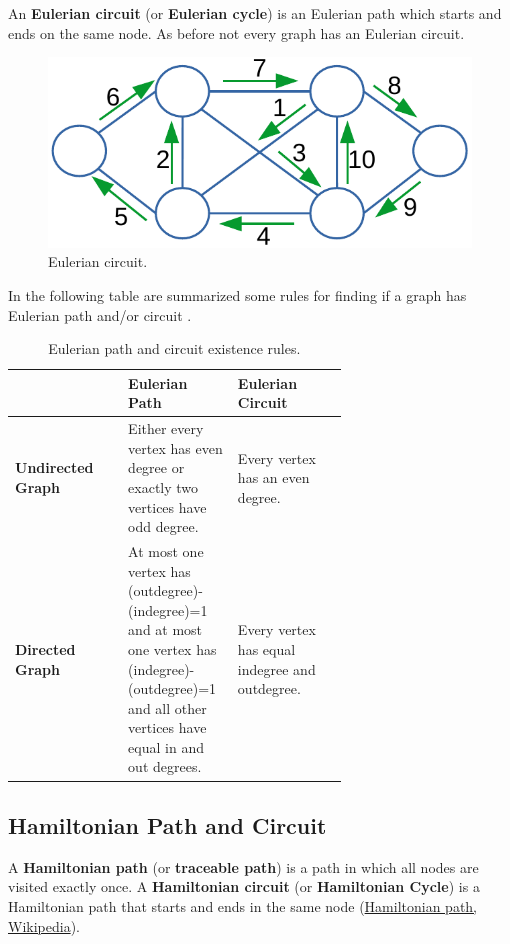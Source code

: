 An \textbf{Eulerian circuit} (or \textbf{Eulerian cycle}) is an Eulerian path which starts and ends on the same node. As before not every graph has an Eulerian circuit.

\begin{figure}[H]
	\begin{center}
		\includegraphics[scale=.6]{chapters/graphs/images/graphs_9.pdf}
		\caption[Eulerian circuit.]{Eulerian circuit.}
		\label{graphs_9}
	\end{center}
\end{figure}

In the following table are summarized some rules for finding if a graph has Eulerian path and/or circuit \cite{eulerpathcircuit}.

\begin{table}[H]
	\caption[Eulerian path and circuit existence rules.]{Eulerian path and circuit existence rules.}
	\label{eulerpathcircuit}
	\centering
	\begin{tabular}{| l | p{0.33\linewidth} | p{0.33\linewidth} |}
		\hline
 			& \textbf{Eulerian Path} & \textbf{Eulerian Circuit} \\
		\hline
		\textbf{Undirected Graph} & Either every vertex has even degree or exactly two vertices have odd degree. &  Every vertex has an even degree. \\
		\hline
		\textbf{Directed Graph} & At most one vertex has \newline (outdegree)-(indegree)=1 and at most one vertex has \newline (indegree)-(outdegree)=1 and all other vertices have equal in and out degrees. & Every vertex has equal indegree and outdegree. \\
		\hline
	\end{tabular}
\end{table}

\subsection{Hamiltonian Path and Circuit}
A \textbf{Hamiltonian path} (or \textbf{traceable path}) is a path in which all nodes are visited exactly once. A \textbf{Hamiltonian circuit} (or \textbf{Hamiltonian Cycle}) is a Hamiltonian path that starts and ends in the same node \cite{wikihamiltoninanpathcircuit} (\href{https://en.wikipedia.org/wiki/Hamiltonian_path}{Hamiltonian path, Wikipedia}).

